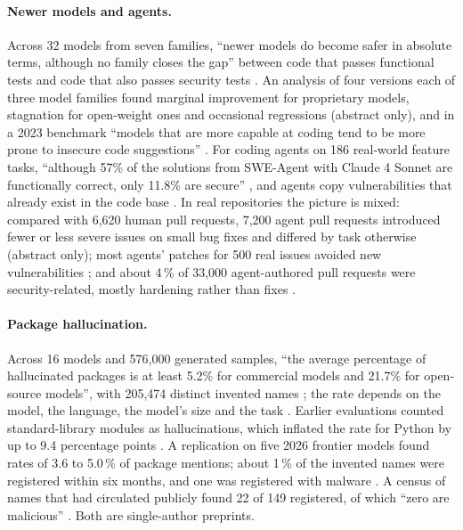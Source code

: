 \paragraph{Newer models and agents.}
Across 32 models from seven families, \enquote{newer models do become safer
in absolute terms, although no family closes the gap} between code that
passes functional tests and code that also passes security tests
\autocite[abstract]{SantosdeMoura2026Newer}.
An analysis of four versions each of three model families found marginal
improvement for proprietary models, stagnation for open-weight ones and
occasional regressions \autocite{Cannavale2026Smarter} (abstract only), and
in a 2023 benchmark \enquote{models that are more capable at coding tend to
be more prone to insecure code suggestions}
\autocite[sect.~1]{Bhatt2023CyberSecEval}.
For coding agents on 186 real-world feature tasks, \enquote{although 57\% of
the solutions from SWE-Agent with Claude 4 Sonnet are functionally correct,
only 11.8\% are secure} \autocite[abstract]{Zhao2026VibeCoding}, and agents
copy vulnerabilities that already exist in the code base
\autocite{Sun2026Propagate}.
In real repositories the picture is mixed: compared with 6,620 human pull
requests, 7,200 agent pull requests introduced fewer or less severe issues
on small bug fixes and differed by task otherwise
\autocite{DectotLeMonnier2026Agentic} (abstract only); most agents' patches
for 500 real issues avoided new vulnerabilities \autocite{ChenJiang2025Agents};
and about 4\,\% of 33,000 agent-authored pull requests were security-related,
mostly hardening rather than fixes \autocite{Siddiq2026Agentic}.

\paragraph{Package hallucination.}
Across 16 models and 576,000 generated samples, \enquote{the average
percentage of hallucinated packages is at least 5.2\% for commercial models
and 21.7\% for open-source models}, with 205,474 distinct invented names
\autocite[abstract]{Spracklen2025Package}; the rate depends on the model,
the language, the model's size and the task \autocite{Krishna2025Phantoms}.
Earlier evaluations counted standard-library modules as hallucinations,
which inflated the rate for Python by up to 9.4 percentage points
\autocite{Djire2026Defenses}.
A replication on five 2026 frontier models found rates of 3.6 to 5.0\,\% of
package mentions; about 1\,\% of the invented names were registered within
six months, and one was registered with malware
\autocite{Churilov2026Range}.
A census of names that had circulated publicly found 22 of 149 registered,
of which \enquote{zero are malicious} \autocite{Okwor2026Registration}.
Both are single-author preprints.

